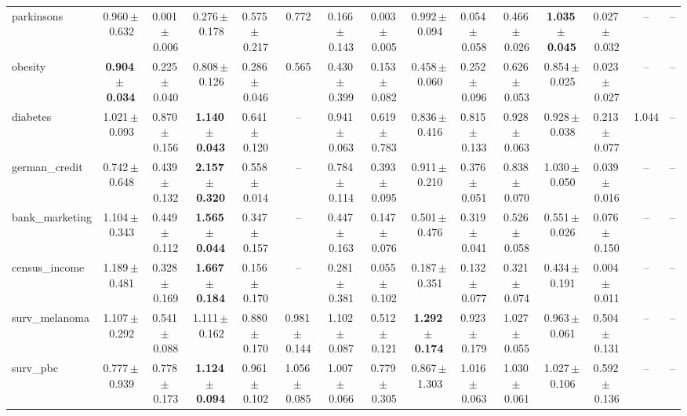 \documentclass[8pt]{extarticle}
\begin{document}
\begin{longtable}{l*{14}{c}}
parkinsons & 0.960\,$\pm$\,0.632 & 0.001\,$\pm$\,0.006 & 0.276\,$\pm$\,0.178 & 0.575\,$\pm$\,0.217 & 0.772 & 0.166\,$\pm$\,0.143 & 0.003\,$\pm$\,0.005 & 0.992\,$\pm$\,0.094 & 0.054\,$\pm$\,0.058 & 0.466\,$\pm$\,0.026 & \textbf{1.035\,$\pm$\,0.045} & 0.027\,$\pm$\,0.032 & -- & -- \\
obesity & \textbf{0.904\,$\pm$\,0.034} & 0.225\,$\pm$\,0.040 & 0.808\,$\pm$\,0.126 & 0.286\,$\pm$\,0.046 & 0.565 & 0.430\,$\pm$\,0.399 & 0.153\,$\pm$\,0.082 & 0.458\,$\pm$\,0.060 & 0.252\,$\pm$\,0.096 & 0.626\,$\pm$\,0.053 & 0.854\,$\pm$\,0.025 & 0.023\,$\pm$\,0.027 & -- & -- \\
diabetes & 1.021\,$\pm$\,0.093 & 0.870\,$\pm$\,0.156 & \textbf{1.140\,$\pm$\,0.043} & 0.641\,$\pm$\,0.120 & -- & 0.941\,$\pm$\,0.063 & 0.619\,$\pm$\,0.783 & 0.836\,$\pm$\,0.416 & 0.815\,$\pm$\,0.133 & 0.928\,$\pm$\,0.063 & 0.928\,$\pm$\,0.038 & 0.213\,$\pm$\,0.077 & 1.044 & -- \\
german\_credit & 0.742\,$\pm$\,0.648 & 0.439\,$\pm$\,0.132 & \textbf{2.157\,$\pm$\,0.320} & 0.558\,$\pm$\,0.014 & -- & 0.784\,$\pm$\,0.114 & 0.393\,$\pm$\,0.095 & 0.911\,$\pm$\,0.210 & 0.376\,$\pm$\,0.051 & 0.838\,$\pm$\,0.070 & 1.030\,$\pm$\,0.050 & 0.039\,$\pm$\,0.016 & -- & -- \\
bank\_marketing & 1.104\,$\pm$\,0.343 & 0.449\,$\pm$\,0.112 & \textbf{1.565\,$\pm$\,0.044} & 0.347\,$\pm$\,0.157 & -- & 0.447\,$\pm$\,0.163 & 0.147\,$\pm$\,0.076 & 0.501\,$\pm$\,0.476 & 0.319\,$\pm$\,0.041 & 0.526\,$\pm$\,0.058 & 0.551\,$\pm$\,0.026 & 0.076\,$\pm$\,0.150 & -- & -- \\
census\_income & 1.189\,$\pm$\,0.481 & 0.328\,$\pm$\,0.169 & \textbf{1.667\,$\pm$\,0.184} & 0.156\,$\pm$\,0.170 & -- & 0.281\,$\pm$\,0.381 & 0.055\,$\pm$\,0.102 & 0.187\,$\pm$\,0.351 & 0.132\,$\pm$\,0.077 & 0.321\,$\pm$\,0.074 & 0.434\,$\pm$\,0.191 & 0.004\,$\pm$\,0.011 & -- & -- \\
surv\_melanoma & 1.107\,$\pm$\,0.292 & 0.541\,$\pm$\,0.088 & 1.111\,$\pm$\,0.162 & 0.880\,$\pm$\,0.170 & 0.981\,$\pm$\,0.144 & 1.102\,$\pm$\,0.087 & 0.512\,$\pm$\,0.121 & \textbf{1.292\,$\pm$\,0.174} & 0.923\,$\pm$\,0.179 & 1.027\,$\pm$\,0.055 & 0.963\,$\pm$\,0.061 & 0.504\,$\pm$\,0.131 & -- & -- \\
surv\_pbc & 0.777\,$\pm$\,0.939 & 0.778\,$\pm$\,0.173 & \textbf{1.124\,$\pm$\,0.094} & 0.961\,$\pm$\,0.102 & 1.056\,$\pm$\,0.085 & 1.007\,$\pm$\,0.066 & 0.779\,$\pm$\,0.305 & 0.867\,$\pm$\,1.303 & 1.016\,$\pm$\,0.063 & 1.030\,$\pm$\,0.061 & 1.027\,$\pm$\,0.106 & 0.592\,$\pm$\,0.136 & -- & -- \\

\end{longtable}
\end{document}
